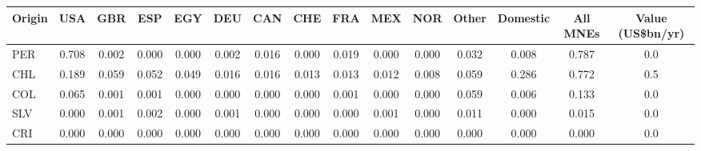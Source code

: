 \begin{tabular}{lcccccccccccccc}
\toprule
Origin & USA & GBR & ESP & EGY & DEU & CAN & CHE & FRA & MEX & NOR & Other & Domestic & All MNEs & Value (US\$bn/yr) \\
\midrule
PER & 0.708 & 0.002 & 0.000 & 0.000 & 0.002 & 0.016 & 0.000 & 0.019 & 0.000 & 0.000 & 0.032 & 0.008 & 0.787 & 0.0 \\
CHL & 0.189 & 0.059 & 0.052 & 0.049 & 0.016 & 0.016 & 0.013 & 0.013 & 0.012 & 0.008 & 0.059 & 0.286 & 0.772 & 0.5 \\
COL & 0.065 & 0.001 & 0.001 & 0.000 & 0.000 & 0.000 & 0.000 & 0.001 & 0.000 & 0.000 & 0.059 & 0.006 & 0.133 & 0.0 \\
SLV & 0.000 & 0.001 & 0.002 & 0.000 & 0.001 & 0.000 & 0.000 & 0.000 & 0.001 & 0.000 & 0.011 & 0.000 & 0.015 & 0.0 \\
CRI & 0.000 & 0.000 & 0.000 & 0.000 & 0.000 & 0.000 & 0.000 & 0.000 & 0.000 & 0.000 & 0.000 & 0.000 & 0.000 & 0.0 \\
\bottomrule
\end{tabular}
